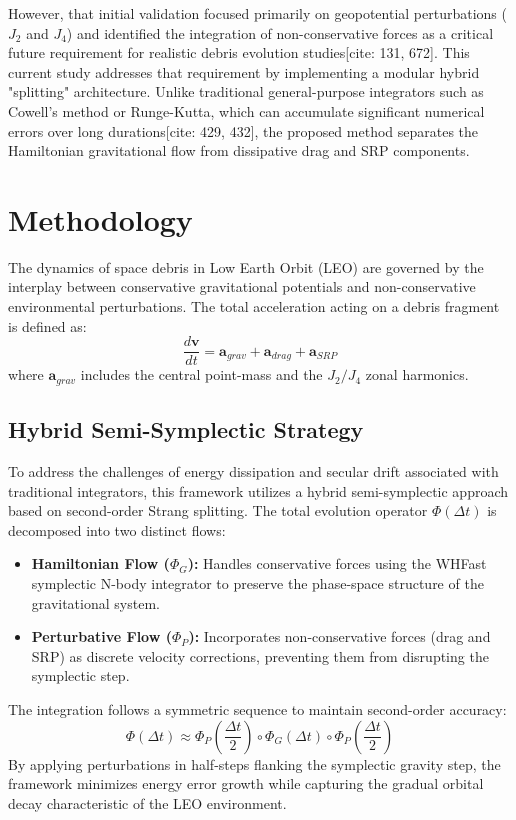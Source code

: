 \documentclass[conf]{AAS} %
\begin{document}
However, that initial validation focused primarily on geopotential perturbations ($J_2$ and $J_4$) and identified the integration of non-conservative forces as a critical future requirement for realistic debris evolution studies[cite: 131, 672]. This current study addresses that requirement by implementing a modular hybrid "splitting" architecture. Unlike traditional general-purpose integrators such as Cowell's method or Runge-Kutta, which can accumulate significant numerical errors over long durations[cite: 429, 432], the proposed method separates the Hamiltonian gravitational flow from dissipative drag and SRP components.

\section{Methodology}
The dynamics of space debris in Low Earth Orbit (LEO) are governed by the interplay between conservative gravitational potentials and non-conservative environmental perturbations. The total acceleration acting on a debris fragment is defined as:
\begin{equation}
    \frac{d\mathbf{v}}{dt} = \mathbf{a}_{grav} + \mathbf{a}_{drag} + \mathbf{a}_{SRP}
\end{equation}
where $\mathbf{a}_{grav}$ includes the central point-mass and the $J_2/J_4$ zonal harmonics.

\subsection{Hybrid Semi-Symplectic Strategy}
To address the challenges of energy dissipation and secular drift associated with traditional integrators, this framework utilizes a hybrid semi-symplectic approach based on second-order Strang splitting. The total evolution operator $\Phi(\Delta t)$ is decomposed into two distinct flows:
\begin{itemize}
    \item \textbf{Hamiltonian Flow ($\Phi_G$):} Handles conservative forces using the WHFast symplectic N-body integrator to preserve the phase-space structure of the gravitational system.
    \item \textbf{Perturbative Flow ($\Phi_P$):} Incorporates non-conservative forces (drag and SRP) as discrete velocity corrections, preventing them from disrupting the symplectic step.
\end{itemize}

The integration follows a symmetric sequence to maintain second-order accuracy:
\begin{equation}
    \Phi(\Delta t) \approx \Phi_P\left(\frac{\Delta t}{2}\right) \circ \Phi_G(\Delta t) \circ \Phi_P\left(\frac{\Delta t}{2}\right)
\end{equation}
By applying perturbations in half-steps flanking the symplectic gravity step, the framework minimizes energy error growth while capturing the gradual orbital decay characteristic of the LEO environment.
\end{document}

